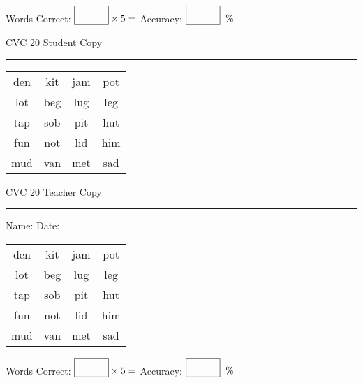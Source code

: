 \documentclass{memoir}
\begin{document}
\small

Words Correct: $\fbox{\phantom{\huge 100}} \times 5 = $ Accuracy: $\fbox{\phantom{\huge 100}}\;\; \%$ 

\vfill

\newpage



\footnotesize \noindent
CVC 20 \hfill Student Copy
\smallskip
\hrule

\Large

\setlength{\tabcolsep}{14pt}
\def\arraystretch{2}

{\selectfont


\begin{vplace}[0.5]
\begin{center}
\begin{tabular}{cccc}
den & kit & jam & pot \\
lot & beg & lug & leg \\
tap & sob & pit & hut \\
fun & not & lid & him \\
mud & van & met & sad \\
\end{tabular}
\end{center}
\end{vplace}

}

\newpage

\footnotesize \noindent
CVC 20 \hfill Teacher Copy
\smallskip
\hrule

\small

\vfill

\noindent
Name: \underline{\hspace{1.75in}} \hfill Date: \underline{\hspace{1in}}

\Large

{\selectfont


\begin{vplace}[0.5]
\begin{center}
\begin{tabular}{cccc}
den & kit & jam & pot \\
lot & beg & lug & leg \\
tap & sob & pit & hut \\
fun & not & lid & him \\
mud & van & met & sad \\
\end{tabular}
\end{center}
\end{vplace}



}

\small

Words Correct: $\fbox{\phantom{\huge 100}} \times 5 = $ Accuracy: $\fbox{\phantom{\huge 100}}\;\; \%$ 

\vfill

\end{document}
